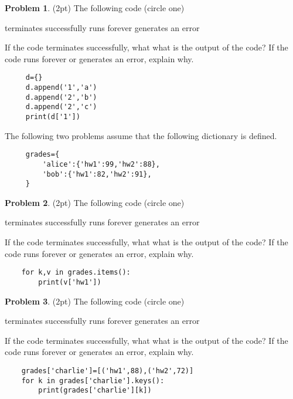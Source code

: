 \documentclass[10pt]{article}
\theoremstyle{definition}
\newtheorem{problem}{Problem}
\begin{document}
\begin{problem}
    (2pt)
    The following code (circle one)
    
    \vspace{0.25in}
    \hspace{0.5in}terminates successfully
    \hspace{1in}runs forever
    \hspace{1in}generates an error
    \vspace{0.25in}

    \noindent
    If the code terminates successfully, what what is the output of the code?
    If the code runs forever or generates an error, explain why.
\end{problem}
\begin{lstlisting}
     d={}
     d.append('1','a')
     d.append('2','b')
     d.append('2','c')
     print(d['1'])
\end{lstlisting}
\vspace{2in}
\newpage
     \noindent
     The following two problems assume that the following dictionary is defined.
     \begin{lstlisting}
     grades={
         'alice':{'hw1':99,'hw2':88},
         'bob':{'hw1':82,'hw2':91},
     }
     \end{lstlisting}
\begin{problem}
    (2pt)
    The following code (circle one)
    
    \vspace{0.25in}
    \hspace{0.5in}terminates successfully
    \hspace{1in}runs forever
    \hspace{1in}generates an error
    \vspace{0.25in}

    \noindent
    If the code terminates successfully, what what is the output of the code?
    If the code runs forever or generates an error, explain why.
\end{problem}
\begin{lstlisting}
    for k,v in grades.items():
        print(v['hw1'])
\end{lstlisting}
\vspace{2.5in}

\begin{problem}
    (2pt)
    The following code (circle one)
    
    \vspace{0.25in}
    \hspace{0.5in}terminates successfully
    \hspace{1in}runs forever
    \hspace{1in}generates an error
    \vspace{0.25in}

    \noindent
    If the code terminates successfully, what what is the output of the code?
    If the code runs forever or generates an error, explain why.
\end{problem}
\begin{lstlisting}
    grades['charlie']=[('hw1',88),('hw2',72)]
    for k in grades['charlie'].keys():
        print(grades['charlie'][k])
\end{lstlisting}
\vspace{1.5in}
\end{document}
